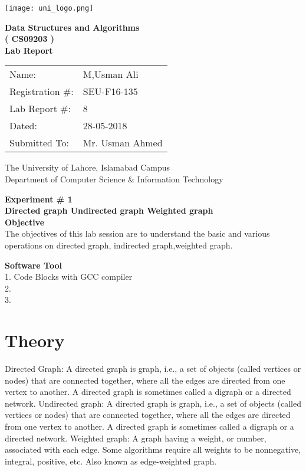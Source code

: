 \documentclass[11pt]{article}            %
\begin{document}
\begin{titlepage}
    \centering
  \vfill
    \texttt{[image: uni\_logo.png]} \\ 
	\vskip2cm
    {\bfseries\Large
	Data Structures and Algorithms \\ ( CS09203 )\\
	
	\vskip2cm
	Lab Report 
	 
	\vskip2cm
	}    

\begin{center}
\begin{tabular}{ l l  } 

Name: & M,Usman Ali  \\ 
Registration \#: & SEU-F16-135 \\ 
Lab Report \#: & 8 \\ 
 Dated:& 28-05-2018\\ 
Submitted To:& Mr. Usman Ahmed\\ 

\end{tabular}
\end{center}
    \vfill
    The University of Lahore, Islamabad Campus\\
Department of Computer Science \& Information Technology
\end{titlepage}


    
    {\bfseries\Large
\centering
	Experiment \# 1 \\

Directed graph
Undirected graph
Weighted graph\\
	
	}    
 \vskip1cm
 \textbf {Objective}\\ The objectives of this lab session are to understand the basic and various operations on directed graph, indirected graph,weighted graph. 
 
 \textbf {Software Tool}\\
1. Code Blocks with GCC compiler\\
2. \\
3. \\

\section{Theory }             Directed Graph:
A directed graph is graph, i.e., a set of objects (called vertices or nodes) that are connected together, where all the edges are directed from one vertex to another. A directed graph is sometimes called a digraph or a directed network.
Undirected graph:
A directed graph is graph, i.e., a set of objects (called vertices or nodes) that are connected together, where all the edges are directed from one vertex to another. A directed graph is sometimes called a digraph or a directed network.
Weighted graph:
 A graph having a weight, or number, associated with each edge. Some algorithms require all weights to be nonnegative, integral, positive, etc. Also known as edge-weighted graph.
\end{document}
